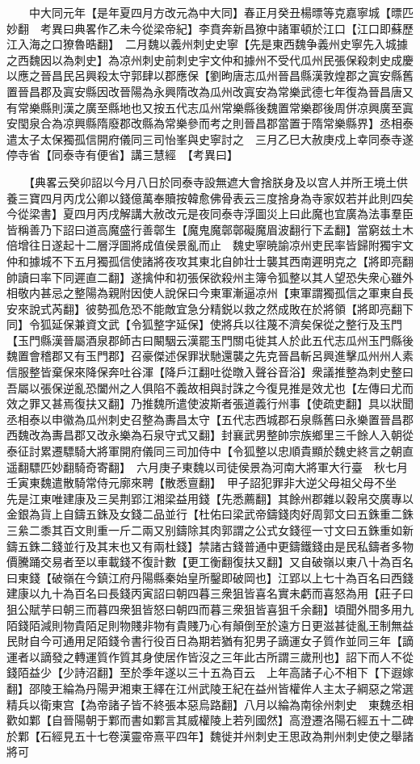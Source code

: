 　　中大同元年【是年夏四月方改元為中大同】春正月癸丑楊㬓等克嘉寧城【㬓匹妙翻　考異曰典畧作乙未今從梁帝紀】李賁奔新昌獠中諸軍頓於江口【江口即蘇歷江入海之口獠魯晧翻】　二月魏以義州刺史史寧【先是東西魏争義州史寧先入城據之西魏因以為刺史】為凉州刺史前刺史宇文仲和據州不受代瓜州民張保殺刺史成慶以應之晉昌民呂興殺太守郭肆以郡應保【劉昫唐志瓜州晉昌縣漢敦煌郡之寘安縣舊置晉昌郡及寘安縣因改晉陽為永興隋改為瓜州改寘安為常樂武德七年復為晉昌唐又有常樂縣則漢之廣至縣地也又按五代志瓜州常樂縣後魏置常樂郡後周併凉興廣至寘安閠泉合為凉興縣隋廢郡改縣為常樂參而考之則晉昌郡當置于隋常樂縣界】丞相泰遣太子太保獨孤信開府儀同三司怡峯與史寧討之　三月乙巳大赦庚戍上幸同泰寺遂停寺省【同泰寺有便省】講三慧經　【考異曰】

　　【典畧云癸卯詔以今月八日於同泰寺設無遮大會捨朕身及以宫人并所王境土供養三寶四月丙戊公卿以錢億萬奉贖按韓愈佛骨表云三度捨身為寺家奴若并此則四矣今從梁書】夏四月丙戌解講大赦改元是夜同泰寺浮圖災上曰此魔也宜廣為法事羣臣皆稱善乃下詔曰道高魔盛行善鄣生【魔鬼魔鄣鄣礙魔眉波翻行下孟翻】當窮兹土木倍增往日遂起十二層浮圖將成值侯景亂而止　魏史寧暁諭凉州吏民率皆歸附獨宇文仲和據城不下五月獨孤信使諸將夜攻其東北自帥壮士襲其西南遲明克之【將即亮翻帥讀曰率下同遲直二翻】遂擒仲和初張保欲殺州主簿令狐整以其人望恐失衆心雖外相敬内甚忌之整陽為親附因使人說保曰今東軍漸逼凉州【東軍謂獨孤信之軍東自長安來說式芮翻】彼勢孤危恐不能敵宜急分精鋭以救之然成敗在於將領【將即亮翻下同】令狐延保兼資文武【令狐整字延保】使將兵以往蔑不濟矣保從之整行及玉門【玉門縣漢晉屬酒泉郡師古曰闞駰云漢罷玉門關屯徙其人於此五代志瓜州玉門縣後魏置會稽郡又有玉門郡】召豪傑述保罪狀馳還襲之先克晉昌斬呂興進擊瓜州州人素信服整皆棄保來降保奔吐谷渾【降戶江翻吐從暾入聲谷音浴】衆議推整為刺史整曰吾屬以張保逆亂恐闔州之人俱陷不義故相與討誅之今復見推是效尤也【左傳曰尤而效之罪又甚焉復扶又翻】乃推魏所遣使波斯者張道義行州事【使疏吏翻】具以狀聞丞相泰以申徽為瓜州刺史召整為夀昌太守【五代志西城郡石泉縣舊曰永樂置晉昌郡西魏改為夀昌郡又改永樂為石泉守式又翻】封襄武男整帥宗族鄉里三千餘人入朝從泰征討累遷驃騎大將軍開府儀同三司加侍中【令狐整以忠順貴顯於魏史終言之朝直遥翻驃匹妙翻騎奇寄翻】　六月庚子東魏以司徒侯景為河南大將軍大行臺　秋七月壬寅東魏遣散騎常侍元廓來聘【散悉亶翻】　甲子詔犯罪非大逆父母祖父母不坐　先是江東唯建康及三吴荆郢江湘梁益用錢【先悉薦翻】其餘州郡雜以穀帛交廣專以金銀為貨上自鑄五銖及女錢二品並行【杜佑曰梁武帝鑄錢肉好周郭文曰五銖重二銖三絫二黍其百文則重一斤二兩又别鑄除其肉郭謂之公式女錢徑一寸文曰五銖重如新鑄五銖二錢並行及其末也又有兩杜錢】禁諸古錢普通中更鑄鐵錢由是民私鑄者多物價騰踊交易者至以車載錢不復計數【更工衡翻復扶又翻】又自破嶺以東八十為百名曰東錢【破嶺在今鎮江府丹陽縣秦始皇所鑿即破岡也】江郢以上七十為百名曰西錢建康以九十為百名曰長錢丙寅詔曰朝四暮三衆狙皆喜名實未虧而喜怒為用【莊子曰狙公賦芋曰朝三而暮四衆狙皆怒曰朝四而暮三衆狙皆喜狙千余翻】頃聞外間多用九陌錢陌減則物貴陌足則物賤非物有貴賤乃心有顛倒至於遠方日更滋甚徒亂王制無益民財自今可通用足陌錢令書行役百日為期若猶有犯男子謫運女子質作並同三年【謫運者以謫發之轉運質作質其身使居作皆沒之三年此古所謂三歲刑也】詔下而人不從錢陌益少【少詩沼翻】至於季年遂以三十五為百云　上年高諸子心不相下【下遐嫁翻】邵陵王綸為丹陽尹湘東王繹在江州武陵王紀在益州皆權侔人主太子綱惡之常選精兵以衛東宫【為帝諸子皆不終張本惡烏路翻】八月以綸為南徐州刺史　東魏丞相歡如鄴【自晉陽朝于鄴而書如鄴言其威權陵上若列國然】高澄遷洛陽石經五十二碑於鄴【石經見五十七卷漢靈帝熹平四年】魏徙并州刺史王思政為荆州刺史使之舉諸將可

